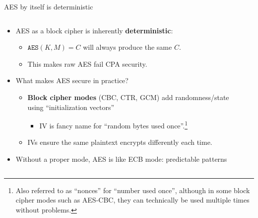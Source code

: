 \documentclass[aspectratio=169, lualatex, handout]{beamer}
\begin{document}
\begin{frame}{AES by itself is deterministic}
	\begin{columns}[c]
		\begin{column}{0.7\textwidth}
			\begin{itemize}
				\item AES as a block cipher is inherently \textbf{deterministic}:
				      \begin{itemize}
					      \item $\texttt{AES}(K, M) = C$ will always produce the same $C$.
					      \item This makes raw AES fail CPA security.
				      \end{itemize}
				\item What makes AES secure in practice?
				      \begin{itemize}
					      \item \textbf{Block cipher modes} (CBC, CTR, GCM) add randomness/state using ``initialization vectors''
					            \begin{itemize}
						            \item IV is fancy name for ``random bytes used once''.\footnote{Also referred to as ``nonces'' for ``number used once'', although in some block cipher modes such as AES-CBC, they can technically be used multiple times without problems.}
					            \end{itemize}
					      \item IVs ensure the same plaintext encrypts differently each time.
				      \end{itemize}
				\item Without a proper mode, AES is like ECB mode: predictable patterns
			\end{itemize}
		\end{column}
		\begin{column}{0.3\textwidth}
			\begin{center}
			\end{center}
		\end{column}
	\end{columns}
\end{frame}
\end{document}
